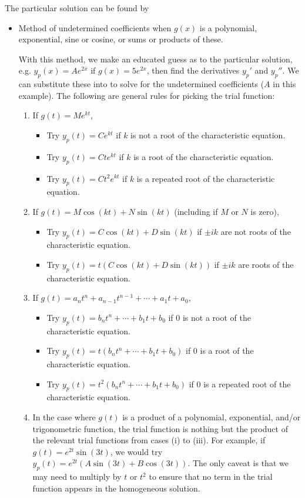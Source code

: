 The particular solution can be found by
\begin{itemize}
	\item Method of undetermined coefficients when $g(x)$ is a polynomial, exponential, sine or cosine, or sums or products of these.
	
	With this method, we make an educated guess as to the particular solution, e.g. $y_p(x) = Ae^{2x}$ if $g(x) = 5e^{2x}$, then find the derivatives $y_p'$ and $y_p''$. We can substitute these into  to solve for the undetermined coefficients ($A$ in this example). The following are general rules for picking the trial function:
	\begin{enumerate}[label=(\roman*)]
		\item If $g(t) = Me^{kt}$,
		\begin{itemize}
			\item Try $y_p(t) = Ce^{kt}$ if $k$ is not a root of the characteristic equation.
			\item Try $y_p(t) = Cte^{kt}$ if $k$ is a root of the characteristic equation.
			\item Try $y_p(t) = Ct^2e^{kt}$ if $k$ is a repeated root of the characteristic equation.
		\end{itemize}
		\item If $g(t) = M\cos(kt) + N\sin(kt)$ (including if $M$ or $N$ is zero),
		\begin{itemize}
			\item Try $y_p(t) = C\cos(kt) + D\sin(kt)$ if $\pm ik$ are not roots of the characteristic equation.
			\item Try $y_p(t) = t(C\cos(kt) + D\sin(kt))$ if $\pm ik$ are roots of the characteristic equation.
		\end{itemize}
		\item If $g(t) = a_nt^n + a_{n-1}t^{n-1} + \cdots + a_1t + a_0$,
		\begin{itemize}
			\item Try $y_p(t) = b_nt^n + \cdots + b_1t + b_0$ if 0 is not a root of the characteristic equation.
			\item Try $y_p(t) = t(b_nt^n + \cdots + b_1t + b_0)$ if 0 is a root of the characteristic equation.
			\item Try $y_p(t) = t^2(b_nt^n + \cdots + b_1t + b_0)$ if 0 is a repeated root of the characteristic equation.
		\end{itemize}
		\item In the case where $g(t)$ is a product of a polynomial, exponential, and/or trigonometric function, the trial function is nothing but the product of the relevant trial functions from cases (i) to (iii). For example, if $g(t) = e^{2t}\sin(3t)$, we would try $y_p(t) = e^{2t}(A\sin(3t) + B\cos(3t))$. The only caveat is that we may need to multiply by $t$ or $t^2$ to ensure that no term in the trial function appears in the homogeneous solution.
	\end{enumerate}
	

\end{itemize}
